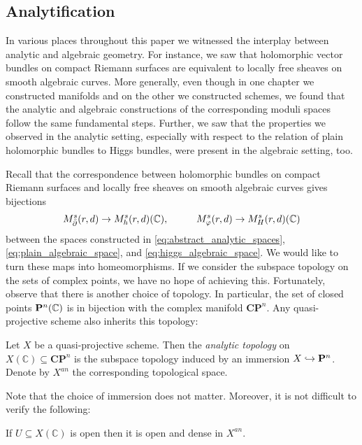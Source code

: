 \documentclass[12pt]{ociamthesis}  %
\begin{document}
\subsection{Analytification}

In various places throughout this paper we witnessed the interplay
between analytic and algebraic geometry. For instance, we saw that
holomorphic vector bundles on compact Riemann surfaces are equivalent
to locally free sheaves on smooth algebraic curves. More generally,
even though in one chapter we constructed manifolds and on the other
we constructed schemes, we found that the analytic and algebraic
constructions of the corresponding moduli spaces follow the same
fundamental steps. Further, we saw that the properties we observed
in the analytic setting, especially with respect to the relation
of plain holomorphic bundles to Higgs bundles, were present in the
algebraic setting, too.

Recall that the correspondence between holomorphic bundles on
compact Riemann surfaces and locally free sheaves on smooth algebraic
curves gives bijections
\begin{align*}
  M^s_{{\bar{\partial}}}(r,d) \to M^s_h(r,d)(\mathbb C), \hspace{1cm}
  M^s_{\varphi}(r,d) \to M^s_H(r,d)(\mathbb C)
\end{align*}
between the spaces constructed in \ref{eq:abstract_analytic_spaces},
\ref{eq:plain_algebraic_space}, and \ref{eq:higgs_algebraic_space}.
We would like to turn these maps into homeomorphisms. If we consider
the subspace topology on the sets of complex points, we have no hope
of achieving this. Fortunately, observe that there is another choice of
topology. In particular, the set of closed points $\mathbf{P}^{n}_{}(\mathbb C)$
is in bijection with the complex manifold $\mathbf{CP}^n$. Any quasi-projective
scheme also inherits this topology:

\begin{definition}
  Let $X$ be a quasi-projective scheme. Then the \emph{analytic topology} on
  $X(\mathbb C)\subseteq \mathbf{CP}^n$ is the subspace topology induced by an
  immersion $X\hookrightarrow \mathbf P^n$. Denote by $X^{an}$ the corresponding
  topological space.
\end{definition}

Note that the choice of immersion does not matter.
Moreover, it is not difficult to verify the following:

\begin{lemma}
  If $U\subseteq X(\mathbb C)$ is open then it is open and dense in $X^{an}$.
\end{lemma}
\end{document}
